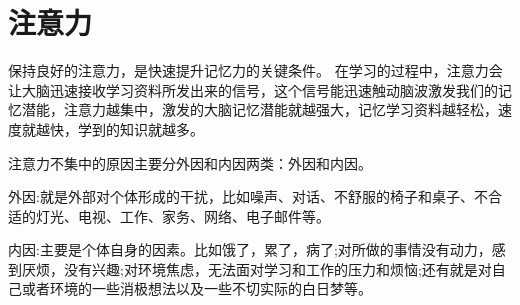 \section{注意力}

保持良好的注意力，是快速提升记忆力的关键条件。
在学习的过程中，注意力会让大脑迅速接收学习资料所发出来的信号，这个信号能迅速触动脑波激发我们的记忆潜能，注意力越集中，激发的大脑记忆潜能就越强大，记忆学习资料越轻松，速度就越快，学到的知识就越多。

注意力不集中的原因主要分外因和内因两类：外因和内因。

外因:就是外部对个体形成的干扰，比如噪声、对话、不舒服的椅子和桌子、不合适的灯光、电视、工作、家务、网络、电子邮件等。

内因:主要是个体自身的因素。比如饿了，累了，病了;对所做的事情没有动力，感到厌烦，没有兴趣;对环境焦虑，无法面对学习和工作的压力和烦恼;还有就是对自己或者环境的一些消极想法以及一些不切实际的白日梦等。


